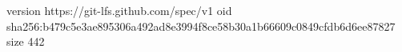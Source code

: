version https://git-lfs.github.com/spec/v1
oid sha256:b479c5e3ae895306a492ad8e3994f8ce58b30a1b66609c0849cfdb6d6ee87827
size 442
